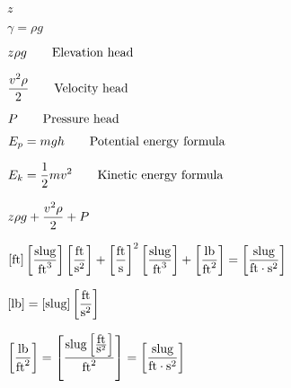 \documentclass[12pt,a4paper,margin=2cm]{book}
\def\lthtmlcheckvsize{\ifdim\ht\sizebox<\vsize 
  \ifdim\wd\sizebox<\hsize\expandafter\hfill\fi \expandafter\vfill
  \else\expandafter\vss\fi}%
\begin{document}
{\newpage\clearpage
{}%
$ z$%
\lthtmlindisplaymathZ
\lthtmlcheckvsize\clearpage}

{\newpage\clearpage
{}%
$ \gamma = \rho g$%
\lthtmlindisplaymathZ
\lthtmlcheckvsize\clearpage}

{\newpage\clearpage
{}%
$\displaystyle z \rho g \hbox{\hskip 20pt Elevation head}$%
\lthtmlindisplaymathZ
\lthtmlcheckvsize\clearpage}

{\newpage\clearpage
{}%
$\displaystyle {v^2 \rho \over 2} \hbox{\hskip 20pt Velocity head}$%
\lthtmlindisplaymathZ
\lthtmlcheckvsize\clearpage}

{\newpage\clearpage
{}%
$\displaystyle P \hbox{\hskip 20pt Pressure head}$%
\lthtmlindisplaymathZ
\lthtmlcheckvsize\clearpage}

{\newpage\clearpage
{}%
$\displaystyle E_p = mgh \hbox{\hskip 20pt Potential energy formula}$%
\lthtmlindisplaymathZ
\lthtmlcheckvsize\clearpage}

{\newpage\clearpage
{}%
$\displaystyle E_k = {1 \over 2}mv^2 \hbox{\hskip 20pt Kinetic energy formula}$%
\lthtmlindisplaymathZ
\lthtmlcheckvsize\clearpage}

{\newpage\clearpage
{}%
$\displaystyle z \rho g + {v^2 \rho \over 2} + P$%
\lthtmlindisplaymathZ
\lthtmlcheckvsize\clearpage}

{\newpage\clearpage
{}%
$\displaystyle [\hbox{ft}] \left[\hbox{slug} \over \hbox{ft}^3\right] \left[\hbox{ft} \over \hbox{s}^2 \right] +  \left[\hbox{ft} \over \hbox{s} \right]^2 \left[\hbox{slug} \over \hbox{ft}^3\right] + \left[\hbox{lb} \over  \hbox{ft}^2\right] = \left[\hbox{slug} \over \hbox{ft} \cdot \hbox{s}^2 \right]$%
\lthtmlindisplaymathZ
\lthtmlcheckvsize\clearpage}

{\newpage\clearpage
{}%
$\displaystyle [\hbox{lb}] = [\hbox{slug}] \left[\hbox{ft} \over \hbox{s}^2\right]$%
\lthtmlindisplaymathZ
\lthtmlcheckvsize\clearpage}

{\newpage\clearpage
{}%
$\displaystyle \left[\hbox{lb} \over  \hbox{ft}^2\right] = \left[\hbox{slug} \left[\hbox{ft} \over \hbox{s}^2\right] \over  \hbox{ft}^2\right] = \left[\hbox{slug} \over \hbox{ft} \cdot \hbox{s}^2 \right]$%
\lthtmlindisplaymathZ
\lthtmlcheckvsize\clearpage}
\end{document}
